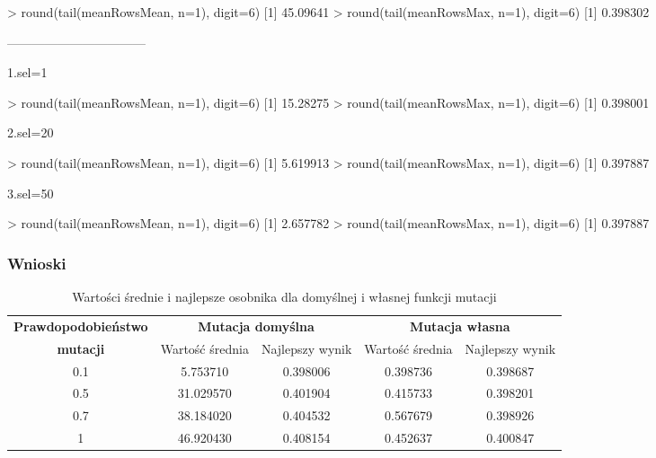 > round(tail(meanRowsMean, n=1), digit=6)
[1] 45.09641
> round(tail(meanRowsMax, n=1),  digit=6)
[1] 0.398302

---------------------------------

1.sel=1

> round(tail(meanRowsMean, n=1), digit=6)
[1] 15.28275
> round(tail(meanRowsMax, n=1),  digit=6)
[1] 0.398001

2.sel=20

> round(tail(meanRowsMean, n=1), digit=6)
[1] 5.619913
> round(tail(meanRowsMax, n=1),  digit=6)
[1] 0.397887

3.sel=50

> round(tail(meanRowsMean, n=1), digit=6)
[1] 2.657782
> round(tail(meanRowsMax, n=1),  digit=6)
[1] 0.397887


\subsubsection{Wnioski}

\begin{table}[!h]
	\hspace*{-1.5in}
	\centering
	\caption{Wartości średnie i najlepsze osobnika dla domyślnej i własnej funkcji mutacji}
	\label{mut_porownanie}
	\hspace*{-0.4in}
	\begin{tabular}{|c|c|c|c|c|}
		\hline
		\textbf{Prawdopodobieństwo} & \multicolumn{2}{c}{\textbf{Mutacja domyślna}}  & \multicolumn{2}{|c|}{\textbf{Mutacja własna}} \\ \cline{2-5}
		\textbf{mutacji} & Wartość średnia & Najlepszy wynik & Wartość średnia & Najlepszy wynik \\ \hline
		
		0.1 & 5.753710  & 0.398006 & 0.398736 & 0.398687 \\
		0.5 & 31.029570 & 0.401904 & 0.415733 & 0.398201 \\
		0.7 & 38.184020 & 0.404532 & 0.567679 & 0.398926 \\
		1   & 46.920430 & 0.408154 & 0.452637 & 0.400847  \\ \hline      
	\end{tabular}
\end{table}
